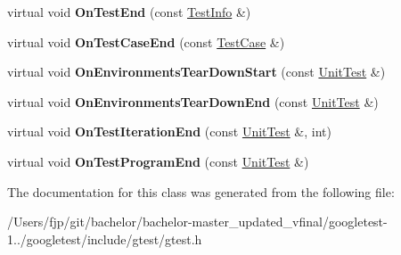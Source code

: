 \begin{DoxyCompactItemize}
\item 
\mbox{\label{classtesting_1_1_empty_test_event_listener_afd58d21005f0d0d0399fb114627545d3}} 
virtual void {\bfseries On\+Test\+End} (const \mbox{\hyperlink{classtesting_1_1_test_info}{Test\+Info}} \&)
\item 
\mbox{\label{classtesting_1_1_empty_test_event_listener_a6bec703158283104c4298f7d8a528515}} 
virtual void {\bfseries On\+Test\+Case\+End} (const \mbox{\hyperlink{classtesting_1_1_test_case}{Test\+Case}} \&)
\item 
\mbox{\label{classtesting_1_1_empty_test_event_listener_a00fa1a4ea5831e20746188414268e7c6}} 
virtual void {\bfseries On\+Environments\+Tear\+Down\+Start} (const \mbox{\hyperlink{classtesting_1_1_unit_test}{Unit\+Test}} \&)
\item 
\mbox{\label{classtesting_1_1_empty_test_event_listener_aea64c83c415b33a4c0b0239bafd1438d}} 
virtual void {\bfseries On\+Environments\+Tear\+Down\+End} (const \mbox{\hyperlink{classtesting_1_1_unit_test}{Unit\+Test}} \&)
\item 
\mbox{\label{classtesting_1_1_empty_test_event_listener_a2253e5a18b3cf7bccd349567a252209d}} 
virtual void {\bfseries On\+Test\+Iteration\+End} (const \mbox{\hyperlink{classtesting_1_1_unit_test}{Unit\+Test}} \&, int)
\item 
\mbox{\label{classtesting_1_1_empty_test_event_listener_a0abcc02bd2331a2e29ad6f4d9daf2a32}} 
virtual void {\bfseries On\+Test\+Program\+End} (const \mbox{\hyperlink{classtesting_1_1_unit_test}{Unit\+Test}} \&)
\end{DoxyCompactItemize}


The documentation for this class was generated from the following file\+:\begin{DoxyCompactItemize}
\item 
/\+Users/fjp/git/bachelor/bachelor-\/master\+\_\+updated\+\_\+vfinal/googletest-\/1../googletest/include/gtest/gtest.\+h\end{DoxyCompactItemize}
